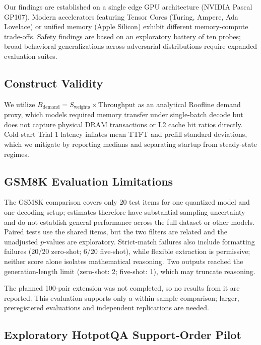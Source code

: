 \documentclass[10pt,a4paper,twocolumn]{article}
\begin{document}
Our findings are established on a single edge GPU architecture (NVIDIA Pascal GP107). Modern accelerators featuring Tensor Cores (Turing, Ampere, Ada Lovelace) or unified memory (Apple Silicon) exhibit different memory-compute trade-offs. Safety findings are based on an exploratory battery of ten probes; broad behavioral generalizations across adversarial distributions require expanded evaluation suites.

\subsection{Construct Validity}

We utilize $B_{\text{demand}} = S_{\text{weights}} \times \text{Throughput}$ as an analytical Roofline demand proxy, which models required memory transfer under single-batch decode but does not capture physical DRAM transactions or L2 cache hit ratios directly. Cold-start Trial 1 latency inflates mean TTFT and prefill standard deviations, which we mitigate by reporting medians and separating startup from steady-state regimes.

\subsection{GSM8K Evaluation Limitations}

The GSM8K comparison covers only 20 test items for one quantized model and one decoding setup; estimates therefore have substantial sampling uncertainty and do not establish general performance across the full dataset or other models. Paired tests use the shared items, but the two filters are related and the unadjusted $p$-values are exploratory. Strict-match failures also include formatting failures (20/20 zero-shot; 6/20 five-shot), while flexible extraction is permissive; neither score alone isolates mathematical reasoning. Two outputs reached the generation-length limit (zero-shot: 2; five-shot: 1), which may truncate reasoning.

The planned 100-pair extension was not completed, so no results from it are reported. This evaluation supports only a within-sample comparison; larger, preregistered evaluations and independent replications are needed.

\subsection{Exploratory HotpotQA Support-Order Pilot}
\end{document}
